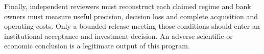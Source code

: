 Finally, independent reviewers must reconstruct each claimed regime and bank owners must measure useful precision, decision loss and complete acquisition and operating costs. Only a bounded release meeting those conditions should enter an institutional acceptance and investment decision. An adverse scientific or economic conclusion is a legitimate output of this program.
